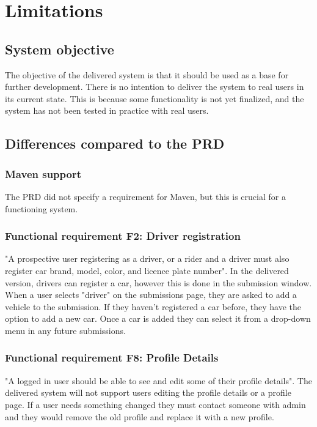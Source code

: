 \documentclass{article}
\begin{document}
\section{Limitations}

\subsection{System objective} %

The objective of the delivered system is that it should be used as a base for further development. There is no intention to deliver the system to real users in its current state. This is because some functionality is not yet finalized, and the system has not been tested in practice with real users.

\subsection{Differences compared to the PRD} %
\subsubsection{Maven support}
The PRD did not specify a requirement for Maven, but this is crucial for a functioning system.

\subsubsection{Functional requirement F2: Driver registration}
"A prospective user registering as a driver, or a rider and a driver must also register car brand, model, color, and licence plate number"\cite{PRD}. In the delivered version, drivers can register a car, however this is done in the submission window. When a user selects "driver" on the submissions page, they are asked to add a vehicle to the submission. If they haven't registered a car before, they have the option to add a new car. Once a car is added they can select it from a drop-down menu in any future submissions.

\subsubsection{Functional requirement F8: Profile Details}\label{profile_details}
"A logged in user should be able to see and edit some of their profile details"\cite{PRD}. The delivered system will not support users editing the profile details or a profile page. If a user needs something changed they must contact someone with admin and they would remove the old profile and replace it with a new profile.
\end{document}

